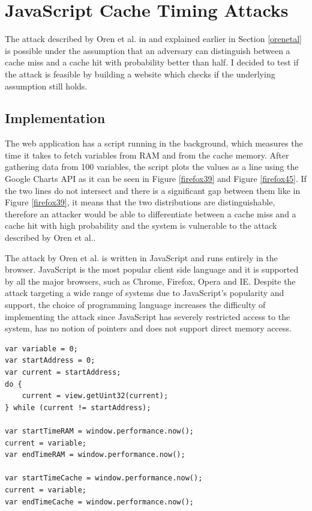\documentclass[10pt,a4paper,twoside]{book}
\begin{document}
\section{JavaScript Cache Timing Attacks}

The attack described by Oren et al. in \cite{oren2015spy} and explained earlier in Section \ref{orenetal} is possible under the assumption that an adversary can distinguish between a cache miss and a cache hit with probability better than half. I decided to test if the attack is feasible by building a website which checks if the underlying assumption still holds. 

\subsection{Implementation}

The web application has a script running in the background, which measures the time it takes to fetch variables from RAM and from the cache memory. After gathering data from 100 variables, the script plots the values as a line using the Google Charts API \cite{googlecharts} as it can be seen in Figure \ref{firefox39} and Figure \ref{firefox45}. If the two lines do not intersect and there is a significant gap between them like in Figure \ref{firefox39}, it means that the two distributions are distinguishable, therefore an attacker would be able to differentiate between a cache miss and a cache hit with high probability and the system is vulnerable to the attack described by Oren et al.\cite{oren2015spy}. 

The attack by Oren et al. \cite{oren2015spy} is written in JavaScript and runs entirely in the browser. JavaScript is the most popular client side language and it is supported by all the major browsers, such as Chrome, Firefox, Opera and IE. Despite the attack targeting a wide range of systems due to JavaScript's popularity and support, the choice of programming language increases the difficulty of implementing the attack since JavaScript has severely restricted access to the system, has no notion of pointers and does not support direct memory access.

\begin{lstlisting}[caption={Code for comparing access times from RAM vs Cache},label={orentest},  xleftmargin=0.7cm]
var variable = 0;
var startAddress = 0;
var current = startAddress;
do {
	current = view.getUint32(current);
} while (current != startAddress);

var startTimeRAM = window.performance.now();
current = variable;
var endTimeRAM = window.performance.now();

var startTimeCache = window.performance.now();
current = variable;
var endTimeCache = window.performance.now();
\end{lstlisting}
\end{document}
